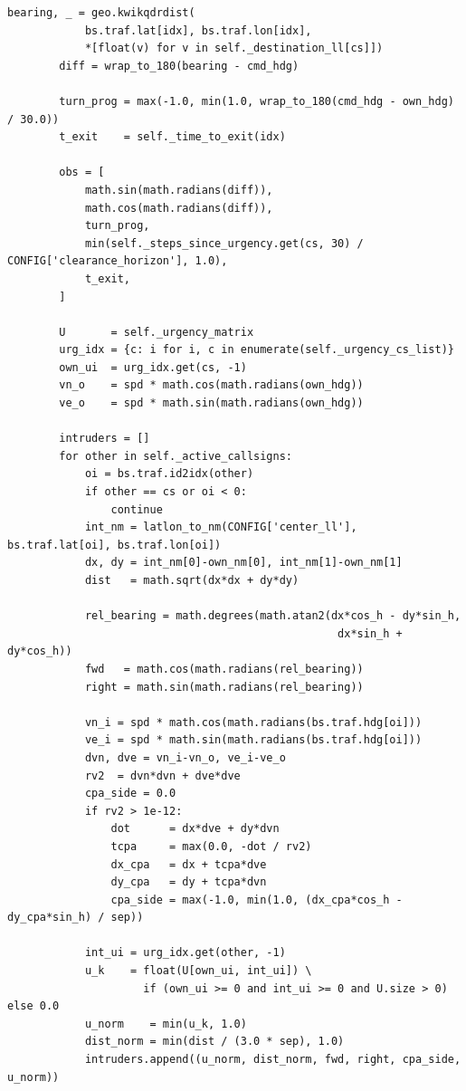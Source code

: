 \documentclass[10pt, a4paper]{article}
\begin{document}
\begin{lstlisting}[caption={v3\_simple\_env.py --- ATCO conflict-resolution environment}, label=lst:env]
        bearing, _ = geo.kwikqdrdist(
            bs.traf.lat[idx], bs.traf.lon[idx],
            *[float(v) for v in self._destination_ll[cs]])
        diff = wrap_to_180(bearing - cmd_hdg)

        turn_prog = max(-1.0, min(1.0, wrap_to_180(cmd_hdg - own_hdg) / 30.0))
        t_exit    = self._time_to_exit(idx)

        obs = [
            math.sin(math.radians(diff)),
            math.cos(math.radians(diff)),
            turn_prog,
            min(self._steps_since_urgency.get(cs, 30) / CONFIG['clearance_horizon'], 1.0),
            t_exit,
        ]

        U       = self._urgency_matrix
        urg_idx = {c: i for i, c in enumerate(self._urgency_cs_list)}
        own_ui  = urg_idx.get(cs, -1)
        vn_o    = spd * math.cos(math.radians(own_hdg))
        ve_o    = spd * math.sin(math.radians(own_hdg))

        intruders = []
        for other in self._active_callsigns:
            oi = bs.traf.id2idx(other)
            if other == cs or oi < 0:
                continue
            int_nm = latlon_to_nm(CONFIG['center_ll'], bs.traf.lat[oi], bs.traf.lon[oi])
            dx, dy = int_nm[0]-own_nm[0], int_nm[1]-own_nm[1]
            dist   = math.sqrt(dx*dx + dy*dy)

            rel_bearing = math.degrees(math.atan2(dx*cos_h - dy*sin_h,
                                                   dx*sin_h + dy*cos_h))
            fwd   = math.cos(math.radians(rel_bearing))
            right = math.sin(math.radians(rel_bearing))

            vn_i = spd * math.cos(math.radians(bs.traf.hdg[oi]))
            ve_i = spd * math.sin(math.radians(bs.traf.hdg[oi]))
            dvn, dve = vn_i-vn_o, ve_i-ve_o
            rv2  = dvn*dvn + dve*dve
            cpa_side = 0.0
            if rv2 > 1e-12:
                dot      = dx*dve + dy*dvn
                tcpa     = max(0.0, -dot / rv2)
                dx_cpa   = dx + tcpa*dve
                dy_cpa   = dy + tcpa*dvn
                cpa_side = max(-1.0, min(1.0, (dx_cpa*cos_h - dy_cpa*sin_h) / sep))

            int_ui = urg_idx.get(other, -1)
            u_k    = float(U[own_ui, int_ui]) \
                     if (own_ui >= 0 and int_ui >= 0 and U.size > 0) else 0.0
            u_norm    = min(u_k, 1.0)
            dist_norm = min(dist / (3.0 * sep), 1.0)
            intruders.append((u_norm, dist_norm, fwd, right, cpa_side, u_norm))


\end{lstlisting}
\end{document}
